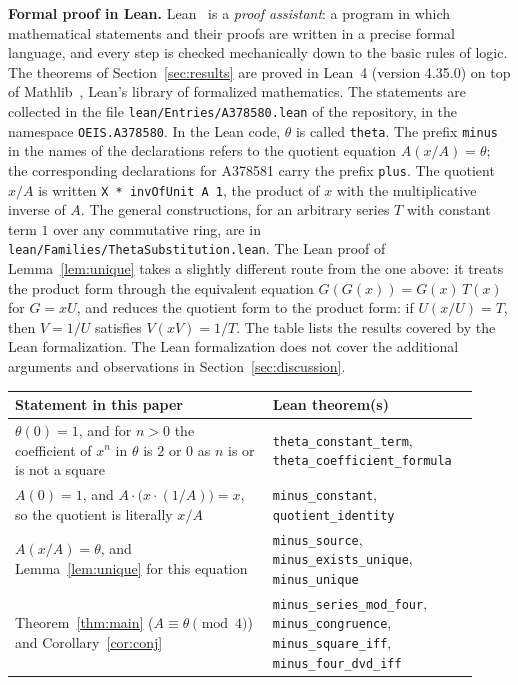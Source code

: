 \documentclass[11pt,a4paper]{article}
\theoremstyle{definition}
\theoremstyle{remark}
\newcommand{\para}[1]{\par\medskip\noindent\textbf{#1}\enspace}
\begin{document}
\para{Formal proof in Lean.}
Lean~\cite{lean} is a \emph{proof assistant}: a program in which mathematical statements and their proofs are written
in a precise formal language, and every step is checked mechanically down to the basic rules of logic. The theorems of Section~\ref{sec:results} are proved in Lean~4 (version 4.35.0) on top of
Mathlib~\cite{mathlib}, Lean's library of formalized mathematics. The statements are collected in the file \texttt{lean/Entries/A378580.lean} of the repository,
in the namespace \texttt{OEIS.A378580}. In the Lean code, $\theta$ is called \texttt{theta}. The prefix \texttt{minus} in the
names of the declarations refers to the quotient equation $A(x/A)=\theta$; the corresponding declarations for A378581 carry the prefix
\texttt{plus}. The quotient $x/A$ is written \texttt{X * invOfUnit A 1}, the
product of $x$ with the multiplicative inverse of $A$. The general constructions, for an arbitrary series $T$ with constant term $1$
over any commutative ring, are in \texttt{lean/Families/ThetaSubstitution.lean}. The Lean proof of Lemma~\ref{lem:unique}
takes a slightly different route from the one above: it treats the product form through the equivalent equation
$G(G(x))=G(x)\,T(x)$ for $G=xU$, and reduces the quotient form to the product form: if $U(x/U)=T$, then $V=1/U$ satisfies $V(xV)=1/T$.
The table lists the results covered by the Lean formalization. The Lean formalization does not cover the additional arguments and observations in Section~\ref{sec:discussion}.
\begin{center}\small\renewcommand{\arraystretch}{1.25}
\begin{tabular}{>{\raggedright\arraybackslash}p{0.52\linewidth}>{\raggedright\arraybackslash}p{0.4\linewidth}}
\toprule
Statement in this paper & Lean theorem(s)\\
\midrule
$\theta(0)=1$, and for $n>0$ the coefficient of $x^n$ in $\theta$ is $2$ or $0$ as $n$ is or is not a square & \texttt{theta\_\allowbreak{}constant\_\allowbreak{}term}, \texttt{theta\_\allowbreak{}coefficient\_\allowbreak{}formula} \\
$A(0)=1$, and $A\cdot\bigl(x\cdot(1/A)\bigr)=x$, so the quotient is literally $x/A$ & \texttt{minus\_\allowbreak{}constant}, \texttt{quotient\_\allowbreak{}identity} \\
$A(x/A)=\theta$, and Lemma~\ref{lem:unique} for this equation & \texttt{minus\_\allowbreak{}source}, \texttt{minus\_\allowbreak{}exists\_\allowbreak{}unique}, \texttt{minus\_\allowbreak{}unique} \\
Theorem~\ref{thm:main} ($A\equiv\theta\pmod 4$) and Corollary~\ref{cor:conj} & \texttt{minus\_\allowbreak{}series\_\allowbreak{}mod\_\allowbreak{}four}, \texttt{minus\_\allowbreak{}congruence}, \texttt{minus\_\allowbreak{}square\_\allowbreak{}iff}, \texttt{minus\_\allowbreak{}four\_\allowbreak{}dvd\_\allowbreak{}iff} \\
\bottomrule
\end{tabular}
\end{center}
\end{document}
